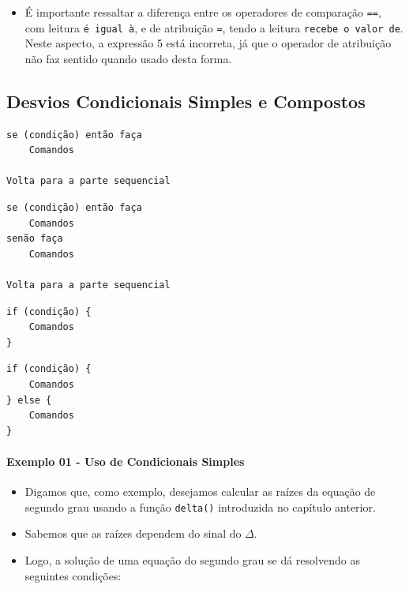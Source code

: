 \documentclass[12pt,a4paper]{article}
\providecommand{\tightlist}{%
      \setlength{\itemsep}{0pt}\setlength{\parskip}{0pt}}
\begin{document}
    \begin{itemize}
\tightlist
\item
  É importante ressaltar a diferença entre os operadores de comparação
  \texttt{==}, com leitura \texttt{é\ igual\ à}, e de atribuição
  \texttt{=}, tendo a leitura \texttt{recebe\ o\ valor\ de}. Neste
  aspecto, a expressão 5 está incorreta, já que o operador de atribuição
  não faz sentido quando usado desta forma.
\end{itemize}

    \hypertarget{desvios-condicionais-simples-e-compostos}{%
\subsection{Desvios Condicionais Simples e
Compostos}\label{desvios-condicionais-simples-e-compostos}}

    \begin{verbatim}
se (condição) então faça
    Comandos

Volta para a parte sequencial
\end{verbatim}

\begin{verbatim}
se (condição) então faça
    Comandos
senão faça
    Comandos

Volta para a parte sequencial
\end{verbatim}

    \begin{verbatim}
if (condição) {
    Comandos
}
\end{verbatim}

\begin{verbatim}
if (condição) {
    Comandos
} else {
    Comandos
}
\end{verbatim}

    \hypertarget{exemplo-01---uso-de-condicionais-simples}{%
\paragraph{Exemplo 01 - Uso de Condicionais
Simples}\label{exemplo-01---uso-de-condicionais-simples}}

    \begin{itemize}
\item
  Digamos que, como exemplo, desejamos calcular as raízes da equação de
  segundo grau usando a função \texttt{delta()} introduzida no capítulo
  anterior.
\item
  Sabemos que as raízes dependem do sinal do \(\Delta\).
\item
  Logo, a solução de uma equação do segundo grau se dá resolvendo as
  seguintes condições:
\end{itemize}
\end{document}
